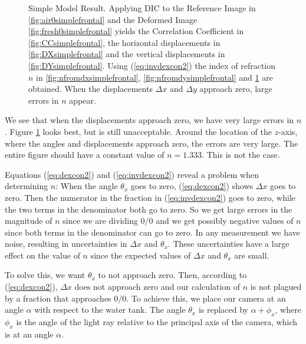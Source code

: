 \documentclass[draft]{svjour3}                     %
\begin{document}
\begin{figure}[htbp]
\begin{subfigure}{.45\linewidth}
	\label{fig:nfrontal}
\end{subfigure}
\caption{Simple Model Result. Applying DIC to the Reference Image in \ref{fig:air0simplefrontal} and the Deformed Image \ref{fig:fresh0simplefrontal} yields the Correlation Coefficient in \ref{fig:CCsimplefrontal}, the horizontal displacements in \ref{fig:DXsimplefrontal} and the vertical displacements in \ref{fig:DYsimplefrontal}. Using (\ref{eq:invdexcon2}) the index of refraction $n$ in \ref{fig:nfromdxsimplefrontal}, \ref{fig:nfromdysimplefrontal} and \ref{fig:nfrontal} are obtained. When the displacements $\Delta x$ and $\Delta y$ approach zero, large errors in $n$ appear. }
\label{fig:simmod}
\end{figure}

We see that when the displacements approach zero, we have very large errors in $n$. Figure \ref{fig:nfrontal} looks best, but is still unacceptable. Around the location of the $z$-axis, where the angles and displacements approach zero, the errors are very large. The entire figure should have a constant value of $n = 1.333$. This is not the case.
 
Equations (\ref{eq:dexcon2}) and (\ref{eq:invdexcon2}) reveal a problem when determining $n$: When the angle $\theta_x$ goes to zero, (\ref{eq:dexcon2}) shows $\Delta x$ goes to zero. Then the numerator in the fraction in (\ref{eq:invdexcon2}) goes to zero, while the two terms in the denominator both go to zero. So we get large errors in the magnitude of $n$ since we are dividing $0/0$ and we get possibly negative values of $n$ since both terms in the denominator can go to zero. In any measurement we have noise, resulting in uncertainties in $\Delta x$ and $\theta_x$. These uncertainties have a large effect on the value of $n$ since the expected values of $\Delta x$ and $\theta_x$ are small. %

To solve this, we want $\theta_x$ to not approach zero. Then, according to (\ref{eq:dexcon2}), $\Delta x$ does not approach zero and our calculation of $n$ is not plagued by a fraction that approaches $0/0$. To achieve this, we place our camera at an angle $\alpha$ with respect to the water tank. The angle $\theta_x$ is replaced by $\alpha+\phi_x$, where $\phi_x$ is the angle of the light ray relative to the principal axis of the camera, which is at an angle $\alpha$. %
\end{document}
